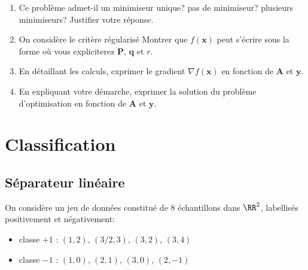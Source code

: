 \documentclass[11pt]{article}
\begin{document}
\begin{enumerate}

	\item Ce problème admet-il un minimiseur unique? pas de minimiseur? plusieurs minimiseurs? Justifier votre réponse.
	
	\item On considère le critère régularisé
	Montrer que $f(\mathbf{x})$ peut s'écrire sous la forme
	où vous expliciterez $\mathbf{P}$, $\mathbf{q}$ et $r$.
	
	\item En détaillant les calculs, exprimer le gradient $\nabla f(\mathbf{x})$ en fonction de $\mathbf{A}$ et $\mathbf{y}$.
	
	\item En expliquant votre démarche, exprimer la solution du problème d'optimisation
	en fonction de $\mathbf{A}$ et $\mathbf{y}$.
	
\end{enumerate}

\section{Classification}

\subsection{Séparateur linéaire}
On considère un jeu de données constitué de $8$ échantillons dans $\RR^2$, labellisés positivement et négativement:
	\begin{itemize}
		\item[-] classe $+1$ : $(1,2)$, $(3/2,3)$, $(3,2)$, $(3,4)$
		\item[-] classe $-1$ : $(1,0)$, $(2,1)$, $(3,0)$, $(2,-1)$
	\end{itemize}
	
\end{document}
